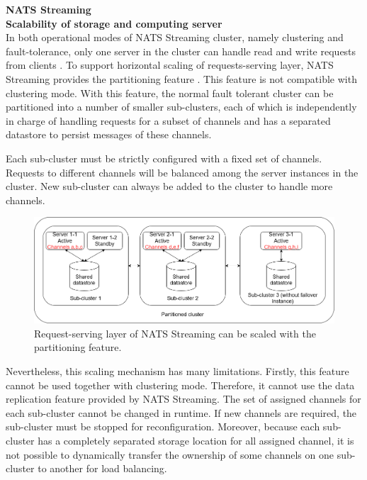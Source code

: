 \large \textbf{NATS Streaming}\\
\normalsize
\textbf{Scalability of storage and computing server}\\
In both operational modes of NATS Streaming cluster, namely clustering and fault-tolerance, only one server in the cluster can handle read and write requests from clients \cite{natsstreaming}. To support horizontal scaling of requests-serving layer, NATS Streaming provides the partitioning feature \cite{natspartitioning}. This feature is not compatible with clustering mode. With this feature, the normal fault tolerant cluster can be partitioned into a number of smaller sub-clusters, each of which is independently in charge of handling requests for a subset of channels and has a separated datastore to persist messages of these channels. 

Each sub-cluster must be strictly configured with a fixed set of channels. Requests to different channels will be balanced among the server instances in the cluster. New sub-cluster can always be added to the cluster to handle more channels. 
\begin{figure}[h]
	\centering
	\includegraphics[width=\linewidth]{images/scalability-nats.png}
	\caption{Request-serving layer of NATS Streaming can be scaled with the partitioning feature.}
	\label{fig:scalabilitynats}
\end{figure}

Nevertheless, this scaling mechanism has many limitations. Firstly, this feature cannot be used together with clustering mode. Therefore, it cannot use the data replication feature provided by NATS Streaming. The set of assigned channels for each sub-cluster cannot be changed in runtime. If new channels are required, the sub-cluster must be stopped for reconfiguration. Moreover, because each sub-cluster has a completely separated storage location for all assigned channel, it is not possible to dynamically transfer the ownership of some channels on one sub-cluster to another for load balancing.
 
